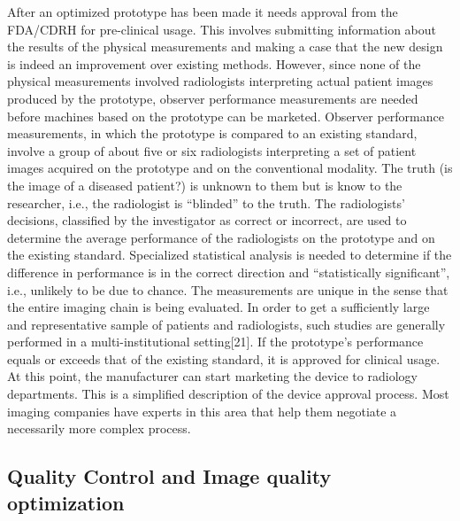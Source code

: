 \documentclass[
]{book}
\begin{document}
After an optimized prototype has been made it needs approval from the FDA/CDRH for pre-clinical usage. This involves submitting information about the results of the physical measurements and making a case that the new design is indeed an improvement over existing methods. However, since none of the physical measurements involved radiologists interpreting actual patient images produced by the prototype, observer performance measurements are needed before machines based on the prototype can be marketed. Observer performance measurements, in which the prototype is compared to an existing standard, involve a group of about five or six radiologists interpreting a set of patient images acquired on the prototype and on the conventional modality. The truth (is the image of a diseased patient?) is unknown to them but is know to the researcher, i.e., the radiologist is ``blinded'' to the truth. The radiologists' decisions, classified by the investigator as correct or incorrect, are used to determine the average performance of the radiologists on the prototype and on the existing standard. Specialized statistical analysis is needed to determine if the difference in performance is in the correct direction and ``statistically significant'', i.e., unlikely to be due to chance. The measurements are unique in the sense that the entire imaging chain is being evaluated. In order to get a sufficiently large and representative sample of patients and radiologists, such studies are generally performed in a multi-institutional setting{[}21{]}. If the prototype's performance equals or exceeds that of the existing standard, it is approved for clinical usage. At this point, the manufacturer can start marketing the device to radiology departments. This is a simplified description of the device approval process. Most imaging companies have experts in this area that help them negotiate a necessarily more complex process.

\hypertarget{quality-control-and-image-quality-optimization}{%
\subsection{Quality Control and Image quality optimization}\label{quality-control-and-image-quality-optimization}}
\end{document}
